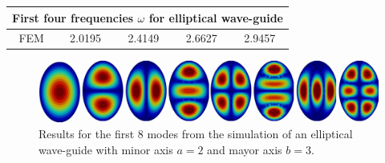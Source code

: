 \begin{center}
\begin{tabular}{|c|c|c|c|c|}
\hline
\multicolumn{5}{|c|}{First four frequencies $\omega$ for elliptical wave-guide} \\
\hline 
FEM     & 2.0195 & 2.4149 & 2.6627 & 2.9457 \\ 
\hline 
\end{tabular} 
\label{tab:eli_wav_comparison}
\end{center}
\begin{figure}
\centering
\includegraphics[scale=0.1]{./img/elliptical_waveguide.pdf}
\caption{Results for the first 8 modes from the simulation of an elliptical wave-guide with minor axis $a=2$ and mayor axis $b=3$.}
\label{fig:elliptical_waveguide}
\end{figure}

